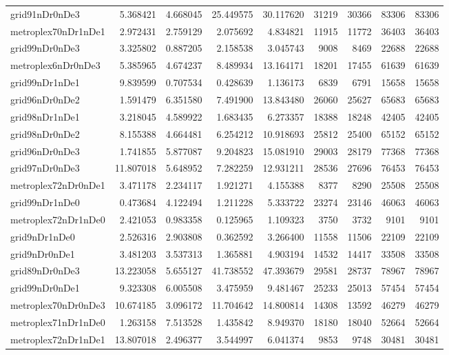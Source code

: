 \begin{longtable}{|l|r|r|r|r|r|r|r|r|}
grid91nDr0nDe3 & 5.368421 & 4.668045 & 25.449575 & 30.117620 & 31219 & 30366 & 83306 & 83306 \\
metroplex70nDr1nDe1 & 2.972431 & 2.759129 & 2.075692 & 4.834821 & 11915 & 11772 & 36403 & 36403 \\
grid99nDr0nDe3 & 3.325802 & 0.887205 & 2.158538 & 3.045743 & 9008 & 8469 & 22688 & 22688 \\
metroplex6nDr0nDe3 & 5.385965 & 4.674237 & 8.489934 & 13.164171 & 18201 & 17455 & 61639 & 61639 \\
grid99nDr1nDe1 & 9.839599 & 0.707534 & 0.428639 & 1.136173 & 6839 & 6791 & 15658 & 15658 \\
grid96nDr0nDe2 & 1.591479 & 6.351580 & 7.491900 & 13.843480 & 26060 & 25627 & 65683 & 65683 \\
grid98nDr1nDe1 & 3.218045 & 4.589922 & 1.683435 & 6.273357 & 18388 & 18248 & 42405 & 42405 \\
grid98nDr0nDe2 & 8.155388 & 4.664481 & 6.254212 & 10.918693 & 25812 & 25400 & 65152 & 65152 \\
grid96nDr0nDe3 & 1.741855 & 5.877087 & 9.204823 & 15.081910 & 29003 & 28179 & 77368 & 77368 \\
grid97nDr0nDe3 & 11.807018 & 5.648952 & 7.282259 & 12.931211 & 28536 & 27696 & 76453 & 76453 \\
metroplex72nDr0nDe1 & 3.471178 & 2.234117 & 1.921271 & 4.155388 & 8377 & 8290 & 25508 & 25508 \\
grid99nDr1nDe0 & 0.473684 & 4.122494 & 1.211228 & 5.333722 & 23274 & 23146 & 46063 & 46063 \\
metroplex72nDr1nDe0 & 2.421053 & 0.983358 & 0.125965 & 1.109323 & 3750 & 3732 & 9101 & 9101 \\
grid9nDr1nDe0 & 2.526316 & 2.903808 & 0.362592 & 3.266400 & 11558 & 11506 & 22109 & 22109 \\
grid9nDr0nDe1 & 3.481203 & 3.537313 & 1.365881 & 4.903194 & 14532 & 14417 & 33508 & 33508 \\
grid89nDr0nDe3 & 13.223058 & 5.655127 & 41.738552 & 47.393679 & 29581 & 28737 & 78967 & 78967 \\
grid99nDr0nDe1 & 9.323308 & 6.005508 & 3.475959 & 9.481467 & 25233 & 25013 & 57454 & 57454 \\
metroplex70nDr0nDe3 & 10.674185 & 3.096172 & 11.704642 & 14.800814 & 14308 & 13592 & 46279 & 46279 \\
metroplex71nDr1nDe0 & 1.263158 & 7.513528 & 1.435842 & 8.949370 & 18180 & 18040 & 52664 & 52664 \\
metroplex72nDr1nDe1 & 13.807018 & 2.496377 & 3.544997 & 6.041374 & 9853 & 9748 & 30481 & 30481 \\

\end{longtable}
